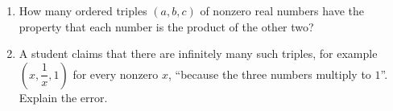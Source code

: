 \begin{enumerate}
\item[(a)] How many ordered triples $(a,b,c)$ of nonzero real numbers have the property that each number is the product of the other two?
\item[(b)] A student claims that there are infinitely many such triples, for example $\left(x,\dfrac{1}{x},1\right)$ for every nonzero $x$, ``because the three numbers multiply to $1$''. Explain the error.
\end{enumerate}
